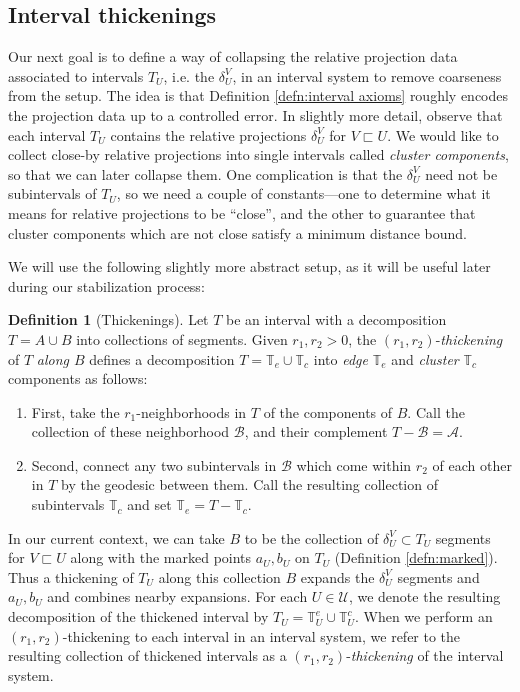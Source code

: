 \documentclass{amsart}
\theoremstyle{definition}
\newtheorem{definition}[theorem]{Definition}
\theoremstyle{remark}
\theoremstyle{definition}
\newcommand{\calA}{\mathcal{A}}
\newcommand{\calB}{\mathcal{B}}
\newcommand{\calU}{\mathcal{U}}
\newcommand{\bT}{\mathbb{T}}
\newcommand{\nest}{\sqsubset}
\begin{document}
\subsection{Interval thickenings}\label{subsec:thickenings}

Our next goal is to define a way of collapsing the relative projection data associated to intervals $T_U$, i.e. the $\delta^V_U$, in an interval system to remove coarseness from the setup.  The idea is that Definition \ref{defn:interval axioms} roughly encodes the projection data up to a controlled error.  In slightly more detail, observe that each interval $T_U$ contains the relative projections $\delta^V_U$ for $V \nest U$.  We would like to collect close-by relative projections into single intervals called \emph{cluster components}, so that we can later collapse them.  One complication is that the $\delta^V_U$ need not be subintervals of $T_U$, so we need a couple of constants---one to determine what it means for relative projections to be ``close'', and the other to guarantee that cluster components which are not close satisfy a minimum distance bound.



We will use the following slightly more abstract setup, as it will be useful later during our stabilization process:

 \begin{definition}[Thickenings]\label{defn:thickening}
Let $T$ be an interval with a decomposition $T = A \cup B$ into collections of segments.  Given $r_1,r_2>0$, the $(r_1,r_2)$-\emph{thickening} of $T$ \emph{along $B$} defines a decomposition $T = \bT_e \cup \bT_c$ into \emph{edge} $\bT_e$ and \emph{cluster} $\bT_c$ components as follows:
\begin{enumerate}
\item First, take the $r_1$-neighborhoods in $T$ of the components of $B$.  Call the collection of these neighborhood $\calB$, and their complement $T - \calB = \calA$.
\item Second, connect any two subintervals in $\calB$ which come within $r_2$ of each other in $T$ by the geodesic between them.  Call the resulting collection of subintervals $\bT_c$ and set $\bT_e = T- \bT_c$.
\end{enumerate}
\end{definition}



In our current context, we can take $B$ to be the collection of $\delta^V_U \subset T_U$ segments for $V \nest U$ along with the marked points $a_U,b_U$ on $T_U$ (Definition \ref{defn:marked}).  Thus a thickening of $T_U$ along this collection $B$ expands the $\delta^V_U$ segments and $a_U,b_U$ and combines nearby expansions.  For each $U \in \calU$, we denote the resulting decomposition of the thickened interval by $T_U = \bT^e_{U} \cup \bT^c_{U}$.  When we perform an $(r_1,r_2)$-thickening to each interval in an interval system, we refer to the resulting collection of thickened intervals as a $(r_1,r_2)$-\emph{thickening} of the interval system.
\end{document}
